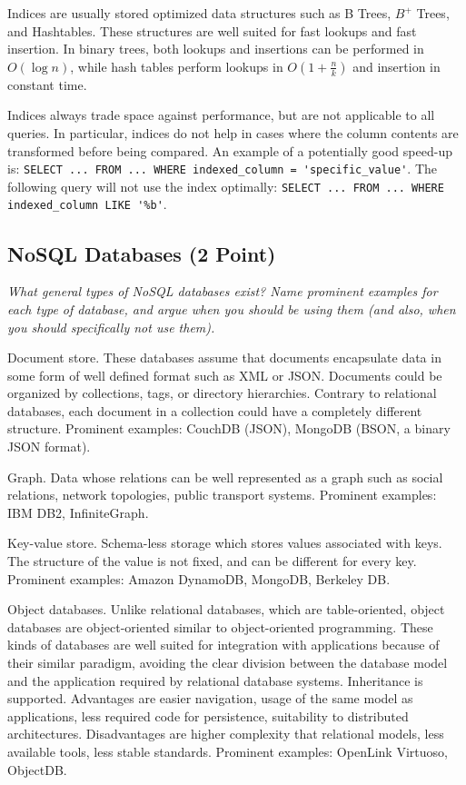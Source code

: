 \documentclass[a4paper,10pt]{article}
\begin{document}
Indices are usually stored optimized data structures such as B Trees, $B^+$ Trees, and Hashtables.
These structures are well suited for fast lookups and fast insertion. In binary trees, both lookups and insertions can be
performed in $O(\log n)$, while hash tables perform lookups in $O(1 + \frac{n}{k})$ and insertion in constant time.

Indices always trade space against performance, but are not applicable to all queries. In particular,
indices do not help in cases where the column contents are transformed before being compared. An example of
a potentially good speed-up is: \lstinline|SELECT ... FROM ... WHERE indexed_column = 'specific_value'|.
The following query will not use the index optimally: \lstinline|SELECT ... FROM ... WHERE indexed_column LIKE '%b'|.

\subsection{NoSQL Databases (2 Point)}

\emph{What general types of NoSQL databases exist? Name prominent examples for each type of database,
and argue when you should be using them (and also, when you should specifically not use them).}

\vspace{3mm}


Document store. These databases assume that documents encapsulate data in some form of well defined
format such as XML or JSON. Documents could be organized by collections, tags, or directory hierarchies.
Contrary to relational databases, each document in a collection could have a completely different
structure.
Prominent examples: CouchDB (JSON), MongoDB (BSON, a binary JSON format).

Graph. Data whose relations can be well represented as a graph such as social relations,
network topologies, public transport systems.
Prominent examples: IBM DB2, InfiniteGraph.

Key-value store. Schema-less storage which stores values associated with keys. The structure of the
value is not fixed, and can be different for every key.
Prominent examples: Amazon DynamoDB, MongoDB, Berkeley DB.

Object databases. Unlike relational databases, which are table-oriented, object databases are
object-oriented similar to object-oriented programming. These kinds of databases are well suited
for integration with applications because of their similar paradigm, avoiding the clear division
between the database model and the application required by relational database systems.
Inheritance is supported. Advantages are easier navigation, usage of the same model as applications, less
required code for persistence, suitability to distributed architectures. Disadvantages are
higher complexity that relational models, less available tools, less stable standards.
Prominent examples: OpenLink Virtuoso, ObjectDB.
\end{document}
